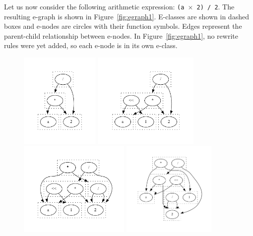 Let us now consider the following arithmetic expression: \texttt{(a $\times$ 2) / 2}. The resulting e-graph is shown in Figure~\ref{fig:egraph1}. E-classes are shown in dashed boxes and e-nodes are circles with their function symbols. Edges represent the parent-child relationship between e-nodes. In Figure~\ref{fig:egraph1}, no rewrite rules were yet added, so each e-node is in its own e-class. 
\begin{figure}[!htb]
    \includegraphics[width=\linewidth, height=4.6cm]{img/egraph1.pdf}
    \caption{}\label{fig:egraph1}
  \endminipage\hfill
    \includegraphics[width=\linewidth, height=4.6cm]{img/egraph2.pdf}
    \caption{}\label{fig:egraph2}
  \endminipage\hfill
    \includegraphics[width=\linewidth, height=4.6cm]{img/egraph3.pdf}
    \caption{}\label{fig:egraph3}
  \endminipage\hfill
    \includegraphics[width=\linewidth, height=4.6cm]{img/egraph4.pdf}
    \caption{}\label{fig:egraph4}
  \endminipage
\end{figure}

